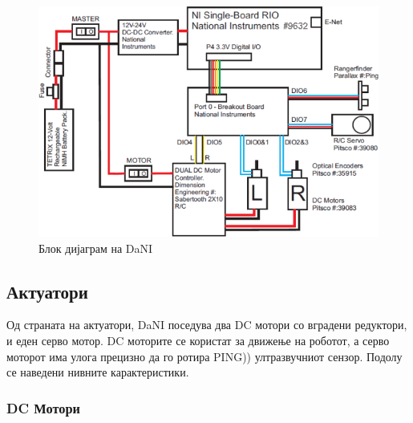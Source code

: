 \documentclass{article}
\begin{document}
\begin{figure}[H]
\includegraphics[width=0.75\linewidth]{dani_block_diagram.png}
\centering
\caption{Блок дијаграм на DaNI}
\label{fig:dani_block_diagram.png}
\end{figure}

\subsection{Актуатори}
Од страната на актуатори, DaNI поседува два DC мотори со вградени редуктори, и еден серво мотор. DC моторите се користат за движење на роботот, а серво моторот има улога прецизно да го ротира PING)) ултразвучниот сензор. Подолу се наведени нивните карактеристики.

\subsubsection{DC Мотори}
\end{document}
